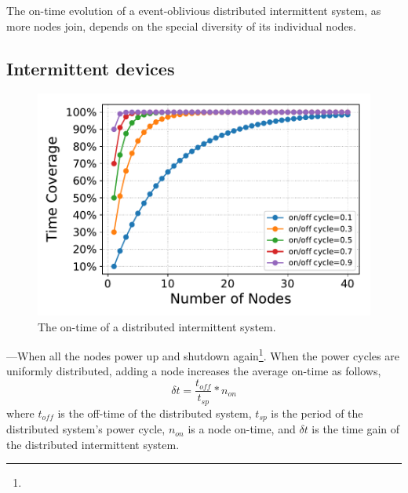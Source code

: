 
The on-time evolution of a event-oblivious distributed intermittent system, as more nodes join, depends on the special diversity of its individual nodes.
\subsection{Intermittent devices}
%
\begin{figure}
	\centering
		\includegraphics[width=\columnwidth]{figures/coverage.pdf}
	\caption{The on-time of a distributed intermittent system.}
	\label{fig:independentCoverage}
\end{figure}
%
---When all the nodes power up and shutdown again\footnote{}. 
When the power cycles are uniformly distributed, adding a node increases the average on-time as follows, 
%
\begin{equation}
\delta t = \frac{t_{off}}{t_{sp}} * n_{on}
		\label{eq:indCov}
\end{equation}
%
where $t_{off}$ is the off-time of the distributed system, $t_{sp}$ is the period of the distributed system's power cycle, $n_{on}$ is a node on-time, and $\delta t$ is the time gain of the distributed intermittent system.

